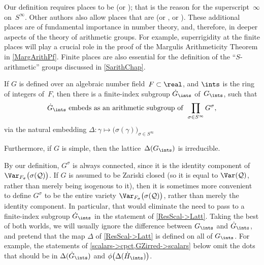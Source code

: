 \begin{other} \label{onlyinfinite}
Our definition requires places to be  (or
); that is the
reason for the superscript~$\infty$ on~$S^\infty$. Other authors also
allow places that are  (or
, or
). These additional places are of
fundamental importance in number theory, and, therefore, in
deeper aspects of the theory of arithmetic groups. For
example, superrigidity at the finite places will play a crucial
role in the proof of the Margulis Arithmeticity Theorem
in \cref{MargArithPf}. 
Finite places are also essential for the definition of the ``$S$-arithmetic'' groups discussed in \cref{SarithChap}.
 \end{other}

\begin{prop} \label{ResScal->Latt}
 If $G$ is defined over an algebraic
number field~$F \subset \real$, and $\ints$ is the
ring of integers of~$F$, then
there is a finite-index subgroup $\dot G_\ints$ of~$G_\ints$, such that
	$$ \text{$\dot G_{\ints}$ embeds as an arithmetic subgroup of
 \ $ \displaystyle \prod_{\sigma \in S^\infty} G^\sigma $} , $$
 via the natural embedding $\Delta \colon \gamma \mapsto
\bigl( \sigma(\gamma) \bigr)_{\sigma \in S^\infty}$ 

Furthermore, if $G$ is simple, then the lattice~$\Delta(G_{\ints})$ is irreducible.
 \end{prop}

\begin{warn}
By our definition, $G^\sigma$ is always connected, since it is the identity component of $\Var_{F_\sigma}\bigl( \sigma(\mathcal{Q})
\bigr)$. If $G$ is assumed to be Zariski closed (so it is equal to $\Var(\mathcal{Q})$, rather than merely being isogenous to it), then it is sometimes more convenient to define $G^\sigma$ to be the entire variety $\Var_{F_\sigma}\bigl( \sigma(\mathcal{Q})
\bigr)$, rather than merely the identity component. In particular, that would eliminate the need to pass to a finite-index subgroup $\dot G_\ints$ in the statement of \cref{ResScal->Latt}. Taking the best of both worlds, we will usually ignore the difference between $G_\ints$ and $\dot G_\ints$, and pretend that the map $\Delta$ of \cref{ResScal->Latt} is defined on all of $G_\ints$. For example, the statements of \cref{scalars->cpct,GZirred->scalars} below omit the dots that should be in $\Delta(\dot G_\ints)$ and $\phi \bigl( \Delta(\dot H_\ints) \bigr)$.
\end{warn}

